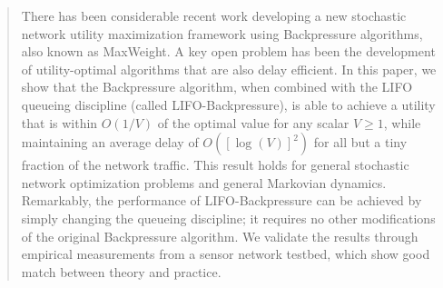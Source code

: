 \documentclass[journal]{IEEEtran}
\begin{document}
 \begin{abstract}
There has been considerable recent work developing a new stochastic network utility maximization framework using Backpressure algorithms, also known as MaxWeight.  A key open problem has been the development of utility-optimal algorithms that are also delay efficient.  In this paper, we show that the Backpressure  algorithm, when combined with the LIFO queueing discipline (called LIFO-Backpressure), is able to achieve a utility that is within $O(1/V)$ of the optimal value for any scalar $V\geq1$, while maintaining an average delay of $O([\log(V)]^2)$ for all but a tiny fraction of the network traffic. 
This result holds for general stochastic network optimization problems and  general Markovian dynamics. 
Remarkably, the performance of LIFO-Backpressure can be achieved by simply changing the queueing discipline; it requires no other modifications of the original Backpressure algorithm.
We validate the results through empirical measurements from a sensor network testbed, which show good match between theory and practice.




 \end{abstract}
 
\end{document}
